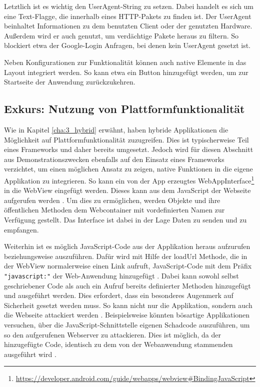 Letztlich ist es wichtig den UserAgent-String zu setzen. Dabei handelt es sich um eine Text-Flagge, die innerhalb eines HTTP-Pakets zu finden ist. Der UserAgent beinhaltet Informationen zu dem benutzten Client oder der genutzten Hardware. Außerdem wird er auch genutzt, um verdächtige Pakete heraus zu filtern\cite{UserAgentString}. So blockiert etwa der Google-Login Anfragen, bei denen kein UserAgent gesetzt ist.

Neben Konfigurationen zur Funktionalität können auch native Elemente in das Layout integriert werden. So kann etwa ein Button hinzugefügt werden, um zur Startseite der Anwendung zurückzukehren.
\\
\subsection{Exkurs: Nutzung von Plattformfunktionalität}
\label{cha:4_2_2}
Wie in Kapitel \ref{cha:3_hybrid} erwähnt, haben hybride Applikationen die Möglichkeit auf Plattformfunktionalität zuzugreifen. 
Dies ist typischerweise Teil eines Frameworks und daher bereits umgesetzt.
Jedoch wird für diesen Abschnitt aus Demonstrationszwecken ebenfalls auf den Einsatz eines Frameworks verzichtet, um einen möglichen Ansatz zu zeigen, native Funktionen in die eigene Applikation zu integrieren. So kann ein von der App erzeugtes WebAppInterface\footnote{\url{https://developer.android.com/guide/webapps/webview\#BindingJavaScript}} in die WebView eingefügt werden. Dieses kann aus dem JavaScript der Webseite aufgerufen werden \cite{webview_javascript_security}. Um dies zu ermöglichen, werden Objekte und ihre öffentlichen Methoden dem Webcontainer mit vordefinierten Namen zur Verfügung gestellt. Das Interface ist dabei in der Lage Daten zu senden und zu empfangen.

Weiterhin ist es möglich JavaScript-Code aus der Applikation heraus aufzurufen beziehungsweise auszuführen. Dafür wird mit Hilfe der loadUrl Methode, die in der WebView normalerweise einen Link aufruft, JavaScript-Code mit dem Präfix \verb|"javascript:"| der Web-Anwendung hinzugefügt \cite{webview_javascript_security}.
Dabei kann sowohl selbst geschriebener Code als auch ein Aufruf bereits definierter Methoden hinzugefügt und ausgeführt werden.
Dies erfordert, dass ein besonderes Augenmerk auf Sicherheit gesetzt werden muss. So kann nicht nur die Applikation, sondern auch die Webseite attackiert werden \cite{webview_javascript_security}. 
Beispielsweise könnten bösartige Applikationen versuchen, über die JavaScript-Schnittstelle eigenen Schadcode auszuführen, um so den aufgerufenen Webserver zu attackieren. Dies ist möglich, da der hinzugefügte Code, identisch zu dem von der Webanwendung stammenden ausgeführt wird \cite{webview_javascript_security}.

